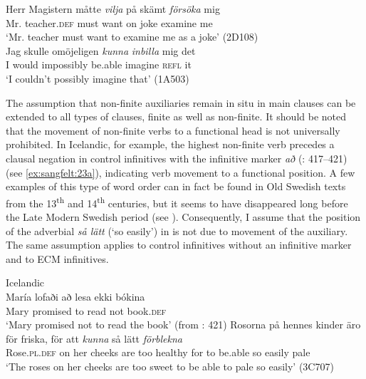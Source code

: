 \documentclass[output=paper, colorlinks, citecolor=brown]{langscibook}
\begin{document}
\ea\label{ex:sangfelt:22}
\ea\label{ex:sangfelt:22a}
\gll Herr Magistern måtte \textit{vilja} {på} {skämt} \textit{försöka} mig \\ %
 Mr. teacher.\textsc{def} must want on joke examine me\\
\glt ‘Mr. teacher must want to examine me as a joke’ (2D108)\\
\ex\label{ex:sangfelt:22b}
\gll Jag skulle {omöjeligen} \textit{kunna} \textit{inbilla} mig det \\
 I would impossibly be.able imagine \textsc{refl} it\\
\glt ‘I couldn’t possibly imagine that’ (1A503)
\z
\z


The assumption that non-finite auxiliaries remain in situ in main clauses can be extended to all types of clauses, finite as well as non-finite. It should be noted that the movement of non-finite verbs to a functional head is not universally prohibited. In Icelandic, for example, the highest non-finite verb precedes a clausal negation in control infinitives with the infinitive marker \textit{að} (\citealt{Thrainsson2007}: 417–421) (see \ref{ex:sangfelt:23a}), indicating verb movement to a functional position. A few examples of this type of word order can in fact be found in Old Swedish texts from the 13\textsuperscript{th} and 14\textsuperscript{th} centuries, but it seems to have disappeared long before the Late Modern Swedish period (see \cites[161]{Delsing1999}[]{Falk2010Studier}[141]{Kalm2016Satsekvivalenta}). Consequently, I assume that the position of the adverbial \textit{så lätt} (‘so easily’) in  is not due to movement of the auxiliary. The same assumption applies to control infinitives without an infinitive marker and to ECM infinitives.


\ea \label{ex:sangfelt:23}
\ea Icelandic\label{ex:sangfelt:23a}\\
\gll María lofaði að lesa {ekki} bókina \\
 Mary promised to read not book.\textsc{def}\\
\glt ‘Mary promised not to read the book’ (from \citealt{Thrainsson2007}: 421)
\ex\label{ex:sangfelt:23b} \gll Rosorna på hennes kinder äro för friska, för att \textit{kunna} så lätt \textit{förblekna} \\
 Rose.\textsc{pl.def} on her cheeks are too healthy for to be.able so easily pale\\
\glt ‘The roses on her cheeks are too sweet to be able to pale so easily’ (3C707)
\z 
\z
\end{document}
